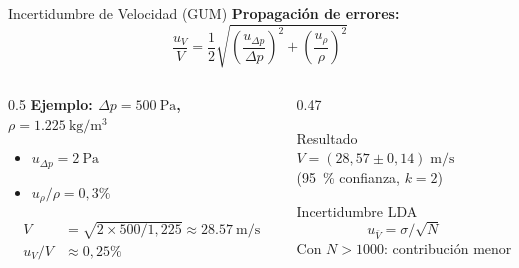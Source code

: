 \documentclass[aspectratio=169,12pt]{beamer}
\begin{document}
\begin{frame}{Incertidumbre de Velocidad (GUM)}
	\textbf{Propagación de errores:}
	\begin{equation*}
		\frac{u_V}{V} = \frac{1}{2}\sqrt{
			\left(\frac{u_{\Delta p}}{\Delta p}\right)^2
			+ \left(\frac{u_\rho}{\rho}\right)^2}
	\end{equation*}

	\vspace{0.3em}
	\begin{columns}
		\begin{column}{0.5\textwidth}
			\textbf{Ejemplo: $\Delta p = \SI{500}{\Pa}$,
				$\rho = \SI{1.225}{\kg\per\m\cubed}$}
			\begin{itemize}\small
				\item $u_{\Delta p} = \SI{2}{\Pa}$
				\item $u_\rho/\rho = 0{,}3\%$
			\end{itemize}
			\begin{align*}
				V     & = \sqrt{2\times500/1{,}225}
				\approx \SI{28.57}{\m\per\s}        \\
				u_V/V & \approx 0{,}25\%
			\end{align*}
		\end{column}
		\begin{column}{0.47\textwidth}
			\begin{alertblock}{Resultado}
				\centering
				$V = (28{,}57 \pm 0{,}14)\;\si{\m\per\s}$\\
				(\SI{95}{\percent} confianza, $k=2$)
			\end{alertblock}
			\vspace{0.3em}
			\begin{exampleblock}{Incertidumbre LDA}
				\begin{equation*}
					u_{\bar{V}} = \sigma / \sqrt{N}
				\end{equation*}
				Con $N > 1000$: contribución menor
			\end{exampleblock}
		\end{column}
	\end{columns}
\end{frame}
\end{document}
